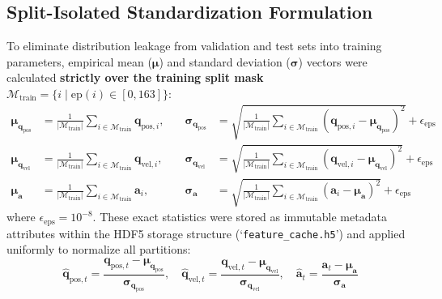 \documentclass[11pt,a4paper]{article}
\begin{document}
\subsection{Split-Isolated Standardization Formulation}
To eliminate distribution leakage from validation and test sets into training parameters, empirical mean ($\boldsymbol{\mu}$) and standard deviation ($\boldsymbol{\sigma}$) vectors were calculated \textbf{strictly over the training split mask} $\mathcal{M}_{\text{train}} = \{i \mid \text{ep}(i) \in [0, 163]\}$:
\begin{align}
    \boldsymbol{\mu}_{\mathbf{q}_{\text{pos}}} &= \frac{1}{|\mathcal{M}_{\text{train}}|} \sum_{i \in \mathcal{M}_{\text{train}}} \mathbf{q}_{\text{pos}, i}, \quad &\boldsymbol{\sigma}_{\mathbf{q}_{\text{pos}}} &= \sqrt{\frac{1}{|\mathcal{M}_{\text{train}}|} \sum_{i \in \mathcal{M}_{\text{train}}} (\mathbf{q}_{\text{pos}, i} - \boldsymbol{\mu}_{\mathbf{q}_{\text{pos}}})^2} + \epsilon_{\text{eps}} \\
    \boldsymbol{\mu}_{\mathbf{q}_{\text{vel}}} &= \frac{1}{|\mathcal{M}_{\text{train}}|} \sum_{i \in \mathcal{M}_{\text{train}}} \mathbf{q}_{\text{vel}, i}, \quad &\boldsymbol{\sigma}_{\mathbf{q}_{\text{vel}}} &= \sqrt{\frac{1}{|\mathcal{M}_{\text{train}}|} \sum_{i \in \mathcal{M}_{\text{train}}} (\mathbf{q}_{\text{vel}, i} - \boldsymbol{\mu}_{\mathbf{q}_{\text{vel}}})^2} + \epsilon_{\text{eps}} \\
    \boldsymbol{\mu}_{\mathbf{a}} &= \frac{1}{|\mathcal{M}_{\text{train}}|} \sum_{i \in \mathcal{M}_{\text{train}}} \mathbf{a}_i, \quad &\boldsymbol{\sigma}_{\mathbf{a}} &= \sqrt{\frac{1}{|\mathcal{M}_{\text{train}}|} \sum_{i \in \mathcal{M}_{\text{train}}} (\mathbf{a}_i - \boldsymbol{\mu}_{\mathbf{a}})^2} + \epsilon_{\text{eps}}
\end{align}
where $\epsilon_{\text{eps}} = 10^{-8}$. These exact statistics were stored as immutable metadata attributes within the HDF5 storage structure (`\texttt{feature\_cache.h5}') and applied uniformly to normalize all partitions:
\begin{equation}
    \hat{\mathbf{q}}_{\text{pos}, t} = \frac{\mathbf{q}_{\text{pos}, t} - \boldsymbol{\mu}_{\mathbf{q}_{\text{pos}}}}{\boldsymbol{\sigma}_{\mathbf{q}_{\text{pos}}}}, \quad \hat{\mathbf{q}}_{\text{vel}, t} = \frac{\mathbf{q}_{\text{vel}, t} - \boldsymbol{\mu}_{\mathbf{q}_{\text{vel}}}}{\boldsymbol{\sigma}_{\mathbf{q}_{\text{vel}}}}, \quad \hat{\mathbf{a}}_t = \frac{\mathbf{a}_t - \boldsymbol{\mu}_{\mathbf{a}}}{\boldsymbol{\sigma}_{\mathbf{a}}}
\end{equation}
\end{document}
